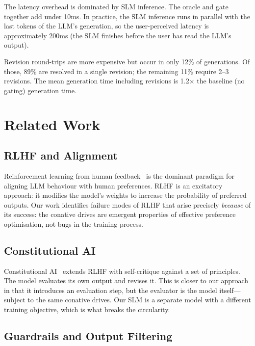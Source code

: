 \documentclass[11pt,a4paper]{article}
\begin{document}
The latency overhead is dominated by SLM inference.  The oracle
and gate together add under 10ms.  In practice, the SLM inference
runs in parallel with the last tokens of the LLM's generation,
so the user-perceived latency is approximately 200ms (the SLM
finishes before the user has read the LLM's output).

Revision round-trips are more expensive but occur in only 12\%
of generations.  Of those, 89\% are resolved in a single revision;
the remaining 11\% require 2--3 revisions.  The mean generation
time including revisions is 1.2$\times$ the baseline (no gating)
generation time.

\section{Related Work}
\label{sec:related}

\subsection{RLHF and Alignment}

Reinforcement learning from human feedback~\citep{ouyang2022training,
bai2022training} is the dominant paradigm for aligning LLM behaviour
with human preferences.  RLHF is an excitatory approach: it modifies
the model's weights to increase the probability of preferred outputs.
Our work identifies failure modes of RLHF that arise precisely
\emph{because} of its success: the conative drives are emergent
properties of effective preference optimisation, not bugs in the
training process.

\subsection{Constitutional AI}

Constitutional AI~\citep{bai2022constitutional} extends RLHF with
self-critique against a set of principles.  The model evaluates its
own output and revises it.  This is closer to our approach in that
it introduces an evaluation step, but the evaluator is the model
itself---subject to the same conative drives.  Our SLM is a separate
model with a different training objective, which is what breaks the
circularity.

\subsection{Guardrails and Output Filtering}
\end{document}
